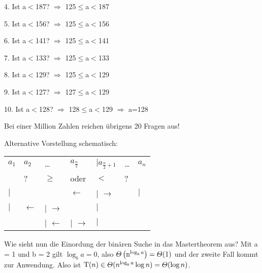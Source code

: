 \documentclass[ngerman]{scrreprt}%
\theoremstyle{break}
\begin{document}
4. Ist a$<$187? $\Rightarrow$ 125$\leq$a$<$187

5. Ist a$<$156? $\Rightarrow$ 125$\leq$a$<$156

6. Ist a$<$141? $\Rightarrow$ 125$\leq$a$<$141

7. Ist a$<$133? $\Rightarrow$ 125$\leq$a$<$133

8. Ist a$<$129? $\Rightarrow$ 125$\leq$a$<$129

9. Ist a$<$127? $\Rightarrow$ 127$\leq$a$<$129

10. Ist a$<$128? $\Rightarrow$ 128$\leq$a$<$129 $\Rightarrow$ a=128 

Bei einer Million Zahlen reichen übrigens 20 Fragen aus!
\bigskip

% 
Alternative Vorstellung schematisch:

\begin{tabular}{lllllll}
$a_1$     & $a_2$           & \dots   &  \( a_{\frac{n}{2}}\) & \( \vert a_{\frac{n}{2}+1}\) & \dots  & $a_n$ \\
          &       ?         & $\geq$  & oder                  & $<$                          &  ?     &\\
$\vert$   &                 &         & $\gets$               & $\vert$ $\to$                &        & $\vert$\\
$\vert$   & $\gets$ & $\vert$ $\to$ & & $\vert$\\
&         & $\vert$ $\gets$ & $\vert$ $\to$ & $\vert$
\end{tabular}
\bigskip

Wie sieht nun die Einordung der binären Suche in das Mastertheorem aus?
Mit a = 1 und b = 2 gilt \(\log_ba = 0\), also \(\Theta\left(\textup{n}^{\log_ba}\right)=\Theta(1)\) und der zweite Fall kommt zur Anwendung.
Also ist \(  \textup{T}(n) \in \Theta(n^{\log_ba}\log n)=\Theta(\log n) \).
\end{document}
